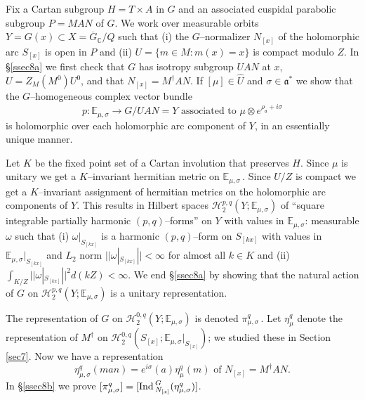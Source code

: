 \documentclass{conm-p-l}
\def\ga{\mathfrak{a}}
\def\Ind{{\rm Ind\,}}
\def\C{\mathbb{C}}
\def\E{\mathbb{E}}
\def\cH{\mathcal{H}}
\begin{document}
Fix a Cartan subgroup $H = T \times A$ in $G$ and an associated
cuspidal parabolic subgroup $P = MAN$ of $G$.  We work over measurable
orbits $Y = G(x) \subset X = \overline{G}_\C /Q$ 
such that (i) the $G$--normalizer $N_{[x]}$ of the holomorphic arc
$S_{[x]}$ is open in $P$ and (ii) $U = \{m \in M : m(x) = x\}$ is compact
modulo $Z$.  In \S \ref{ssec8a} we first check that $G$ has isotropy subgroup 
$UAN$ at $x$, $U = Z_M(M^0)U^0$, and that $N_{[x]} = M^\dagger AN$.  
If $[\mu] \in \widehat{U}$ and $\sigma \in \ga^*$ we show that the 
$G$--homogeneous complex vector bundle 
$$
p: \E_{\mu,\sigma} \to G/UAN = Y
	\text{ associated to } \mu \otimes e^{\rho_\ga + i\sigma}
$$
is holomorphic over each holomorphic arc component of $Y$, in an essentially
unique manner. 

Let $K$ be the fixed point set of a Cartan involution that
preserves $H$.  Since $\mu$ is unitary we get a $K$--invariant hermitian
metric on $\E_{\mu,\sigma}$\,.  Since $U/Z$ is compact we get a $K$--invariant
assignment of hermitian metrics on the holomorphic arc components of $Y$.
This results in Hilbert spaces $\cH_2^{p,q}(Y;\E_{\mu,\sigma})$
of ``square integrable partially harmonic $(p,q)$--forms'' on $Y$ with
values in $\E_{\mu,\sigma}$: measurable $\omega$ such that (i) 
$\omega|_{S_{[kx]}}$ is a harmonic $(p,q)$--form on $S_{[kx]}$ with values
in $\E_{\mu,\sigma}|_{S_{[kx]}}$ and $L_2$ norm 
$||\omega|_{S_{[kx]}}|| < \infty$ for almost all $k \in K$ and (ii)
$\int_{K/Z} ||\omega|_{S_{[kx]}}||^2 d(kZ) < \infty$.  We end \S \ref{ssec8a}
by showing that the natural action of $G$ on $\cH_2^{p,q}(Y;\E_{\mu,\sigma})$
is a unitary representation.

The representation of $G$  on $\cH_2^{0,q}(Y;\E_{\mu,\sigma})$ is denoted
$\pi_{\mu,\sigma}^q$\,.  Let $\eta_\mu^q$ denote the representation of
$M^\dagger$ on $\cH_2^{0,q}(S_{[x]};\E_{\mu,\sigma}|_{S_{[x]}})$; we studied 
these in Section \ref{sec7}.  Now we have a representation 
$$
\eta_{\mu,\sigma}^q(man) = e^{i\sigma}(a)
	\eta_\mu^q(m) \text{ of } N_{[x]} = M^\dagger AN.
$$
In \S \ref{ssec8b} we prove 
$[\pi_{\mu,\sigma}^q] = [\Ind_{N_{[x]}}^G(\eta_{\mu,\sigma}^q)]$.
\end{document}

